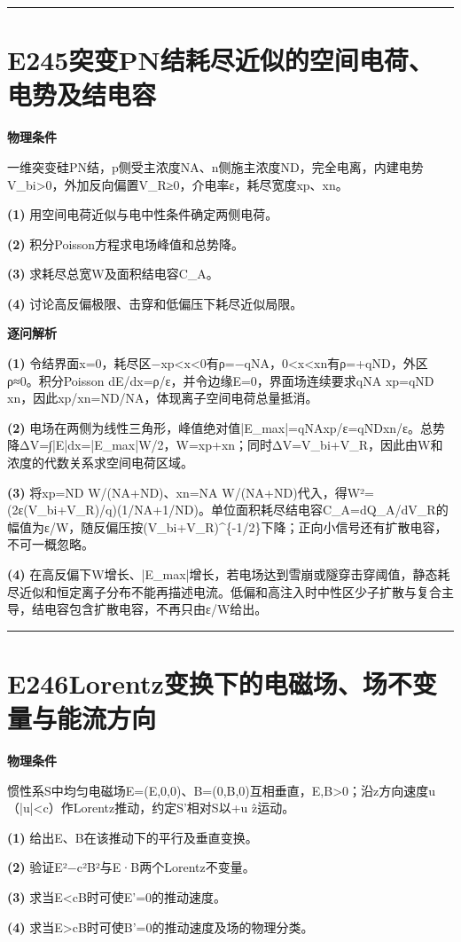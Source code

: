 \documentclass[UTF8,a4paper,11pt,oneside,openany]{ctexbook}
\begin{document}
\par\bigskip\hrule\bigskip
\section*{E245\quad 突变PN结耗尽近似的空间电荷、电势及结电容}
\textbf{物理条件}\par 一维突变硅PN结，p侧受主浓度NA、n侧施主浓度ND，完全电离，内建电势V\_bi>0，外加反向偏置V\_R≥0，介电率ε，耗尽宽度xp、xn。
\par\noindent\textbf{(1)} 用空间电荷近似与电中性条件确定两侧电荷。
\par\noindent\textbf{(2)} 积分Poisson方程求电场峰值和总势降。
\par\noindent\textbf{(3)} 求耗尽总宽W及面积结电容C\_A。
\par\noindent\textbf{(4)} 讨论高反偏极限、击穿和低偏压下耗尽近似局限。

\par\medskip\noindent\textbf{逐问解析}
\par\noindent\textbf{(1)} 令结界面x=0，耗尽区−xp<x<0有ρ=−qNA，0<x<xn有ρ=+qND，外区ρ≈0。积分Poisson dE/dx=ρ/ε，并令边缘E=0，界面场连续要求qNA xp=qND xn，因此xp/xn=ND/NA，体现离子空间电荷总量抵消。
\par\noindent\textbf{(2)} 电场在两侧为线性三角形，峰值绝对值|E\_max|=qNAxp/ε=qNDxn/ε。总势降ΔV=∫|E|dx=|E\_max|W/2，W=xp+xn；同时ΔV=V\_bi+V\_R，因此由W和浓度的代数关系求空间电荷区域。
\par\noindent\textbf{(3)} 将xp=ND W/(NA+ND)、xn=NA W/(NA+ND)代入，得W²=(2ε(V\_bi+V\_R)/q)(1/NA+1/ND)。单位面积耗尽结电容C\_A=dQ\_A/dV\_R的幅值为ε/W，随反偏压按(V\_bi+V\_R)\textasciicircum{}\{-1/2\}下降；正向小信号还有扩散电容，不可一概忽略。
\par\noindent\textbf{(4)} 在高反偏下W增长、|E\_max|增长，若电场达到雪崩或隧穿击穿阈值，静态耗尽近似和恒定离子分布不能再描述电流。低偏和高注入时中性区少子扩散与复合主导，结电容包含扩散电容，不再只由ε/W给出。

\par\bigskip\hrule\bigskip
\section*{E246\quad Lorentz变换下的电磁场、场不变量与能流方向}
\textbf{物理条件}\par 惯性系S中均匀电磁场E=(E,0,0)、B=(0,B,0)互相垂直，E,B>0；沿z方向速度u（|u|<c）作Lorentz推动，约定S'相对S以+u ẑ运动。
\par\noindent\textbf{(1)} 给出E、B在该推动下的平行及垂直变换。
\par\noindent\textbf{(2)} 验证E²−c²B²与E·B两个Lorentz不变量。
\par\noindent\textbf{(3)} 求当E<cB时可使E'=0的推动速度。
\par\noindent\textbf{(4)} 求当E>cB时可使B'=0的推动速度及场的物理分类。
\end{document}
